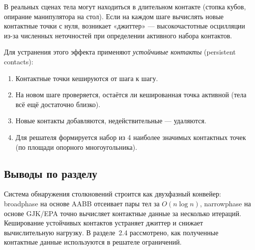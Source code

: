 В реальных сценах тела могут находиться в длительном контакте (стопка кубов, опирание манипулятора на стол). 
Если на каждом шаге вычислять новые контактные точки с нуля, возникает «джиттер» --- высокочастотные 
осцилляции из-за численных неточностей при определении активного набора контактов.

Для устранения этого эффекта применяют \emph{устойчивые контакты} (persistent contacts):

\begin{enumerate}
  \item Контактные точки кешируются от шага к шагу.
  \item На новом шаге проверяется, остаётся ли кешированная точка активной (тела всё ещё достаточно близко).
  \item Новые контакты добавляются, недействительные --- удаляются.
  \item Для решателя формируется набор из 4 наиболее значимых контактных точек (по площади опорного многоугольника).
\end{enumerate}

\subsection{Выводы по разделу}

Система обнаружения столкновений строится как двухфазный конвейер: broadphase на основе AABB отсеивает пары 
тел за $O(n \log n)$, narrowphase на основе GJK/EPA точно вычисляет контактные данные за несколько итераций. 
Кеширование устойчивых контактов устраняет джиттер и снижает вычислительную нагрузку. В разделе~2.4 
рассмотрено, как полученные контактные данные используются в решателе ограничений.
